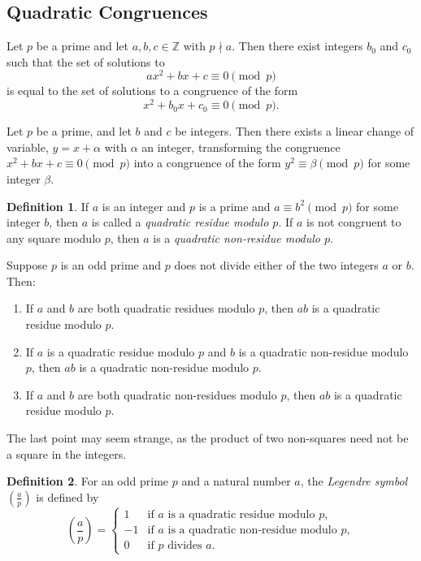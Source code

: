 \documentclass{article}
\theoremstyle{definition}
\newtheorem*{definition*}{Definition}
\newenvironment{manualtheorem}[1]{%
  \renewcommand{\thetheorem}{#1}%
  \theorem%
}{%
  \endtheorem%
}
\begin{document}
\subsection{Quadratic Congruences}

\begin{manualtheorem}{7.1}
	Let $p$ be a prime and let $a, b, c \in \mathbb{Z}$ with $p \nmid a$.
	Then there exist integers $b_0$ and $c_0$ such that the set of solutions to
	\[
		a x^2 + b x + c \equiv 0 \pmod{p}
	\]
	is equal to the set of solutions to a congruence of the form
	\[
		x^2 + b_0 x + c_0 \equiv 0 \pmod{p}.
	\]
\end{manualtheorem}
\begin{manualtheorem}{7.2}
	Let $p$ be a prime, and let $b$ and $c$ be integers.
	Then there exists a linear change of variable, $y = x + \alpha$ with $\alpha$ an integer, transforming the congruence $x^2 + bx + c \equiv 0 \pmod{p}$ into a congruence of the form $y^2 \equiv \beta \pmod{p}$ for some integer $\beta$.
\end{manualtheorem}

\begin{definition*}
	If $a$ is an integer and $p$ is a prime and $a \equiv b^2 \pmod{p}$ for some integer $b$, then $a$ is called a \emph{quadratic residue modulo $p$}. If $a$ is not congruent to any square modulo $p$, then $a$ is a \emph{quadratic non-residue modulo $p$}.
\end{definition*}

\begin{manualtheorem}{7.7}
	Suppose $p$ is an odd prime and $p$ does not divide either of the two integers $a$ or $b$. Then:
	\begin{enumerate}
		\item If $a$ and $b$ are both quadratic residues modulo $p$, then $ab$ is a quadratic residue modulo $p$.
		\item If $a$ is a quadratic residue modulo $p$ and $b$ is a quadratic non-residue modulo $p$, then $ab$ is a quadratic non-residue modulo $p$.
		\item If $a$ and $b$ are both quadratic non-residues modulo $p$, then $ab$ is a quadratic residue modulo $p$.
	\end{enumerate}

	The last point may seem strange, as the product of two non-squares need not be a square in the integers.
\end{manualtheorem}

\begin{definition*}
	For an odd prime $p$ and a natural number $a$, the \emph{Legendre symbol} $\left( \frac{a}{p} \right)$ is defined by
	\[
		\left( \frac{a}{p} \right) =
		\begin{cases}
			1  & \text{if } a \text{ is a quadratic residue modulo } p,     \\[4pt]
			-1 & \text{if } a \text{ is a quadratic non-residue modulo } p, \\[4pt]
			0  & \text{if } p \text{ divides } a.
		\end{cases}
	\]
\end{definition*}
\end{document}
